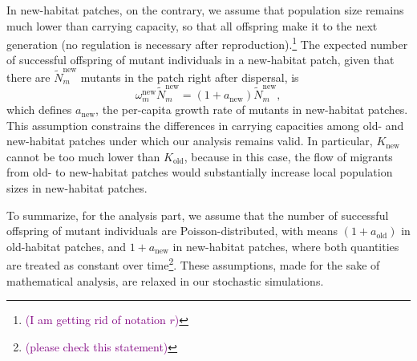 \documentclass[11pt]{article}
\newcommand{\florence}[1]{\textcolor{purple}{(#1)}} %
\begin{document}
In new-habitat patches, on the contrary, we assume that population size remains much lower than carrying capacity, so that all offspring make it to the next generation (no regulation is necessary after reproduction).\footnote{\florence{I am getting rid of notation $r$}} The expected number of successful offspring of mutant individuals in a new-habitat patch, given that there are $\widetilde{N}^{\text{new}}_m$ mutants in the patch right after dispersal, is 
%
\begin{equation}\label{eq:defanew}
\omega_{m}^{\text{new}} \widetilde{N}^{\text{new}}_m = \left(1+a_{\text{new}} \right) \widetilde{N}^{\text{new}}_m,
\end{equation}
which defines $a_{\text{new}}$, the per-capita growth rate of mutants in new-habitat patches. This assumption constrains the differences in carrying capacities among old- and new-habitat patches under which our analysis remains valid. In particular, $K_{\text{new}}$ cannot be too much lower than $K_{\text{old}}$, because in this case, the flow of migrants from old- to new-habitat patches would substantially increase local population sizes in new-habitat patches. 

To summarize, for the analysis part, we assume that the number of successful offspring of mutant individuals are Poisson-distributed, with means $(1+ a_{\text{old}})$ in old-habitat patches, and $1+ a_{\text{new}}$ in new-habitat patches, where both quantities are treated as constant over time\footnote{\florence{please check this statement}}.  These assumptions, made for the sake of mathematical analysis, are relaxed in our stochastic simulations.
\end{document}
